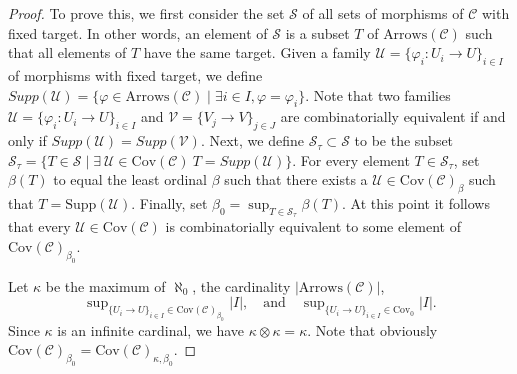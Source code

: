 \begin{proof}
To prove this, we first consider the set $\mathcal{S}$ of all
sets of morphisms of $\mathcal{C}$ with fixed target.
In other words, an element of $\mathcal{S}$ is a subset $T$
of $\text{Arrows}(\mathcal{C})$ such that all
elements of $T$ have the same target. Given a family
$\mathcal{U} = \{\varphi_i : U_i \to U\}_{i\in I}$ of morphisms with fixed
target, we define
$Supp(\mathcal{U}) = \{ \varphi \in \text{Arrows}(\mathcal{C})
\mid \exists i\in I, \varphi = \varphi_i\}$.
Note that two families $\mathcal{U} =  \{\varphi_i : U_i \to U\}_{i\in I}$
and $\mathcal{V} = \{V_j \to V\}_{j \in J}$ are combinatorially
equivalent if and only if $Supp(\mathcal{U}) = Supp(\mathcal{V})$.
Next, we define
$\mathcal{S}_\tau \subset \mathcal{S}$ to be the subset
$\mathcal{S}_\tau = \{ T \in \mathcal{S} \mid
\exists\ \mathcal{U} \in \text{Cov}(\mathcal{C}) \ T = Supp(\mathcal{U})\}$.
For every element $T \in \mathcal{S}_\tau$, set
$\beta(T)$ to equal the least ordinal $\beta$ such that
there exists a $\mathcal{U} \in \text{Cov}(\mathcal{C})_\beta$
such that $T = \text{Supp}(\mathcal{U})$. Finally, set
$\beta_0 = \sup_{T \in \mathcal{S}_\tau} \beta(T)$.
At this point it follows that every $\mathcal{U} \in \text{Cov}(\mathcal{C})$
is combinatorially equivalent to some element
of $\text{Cov}(\mathcal{C})_{\beta_0}$.

\medskip\noindent
Let $\kappa$ be the maximum of $\aleph_0$,
the cardinality $|\text{Arrows}(\mathcal{C})|$,
$$
\sup\nolimits_{\{U_i \to U\}_{i\in I} \in \text{Cov}(\mathcal{C})_{\beta_0}}
|I|,
\quad\text{and}\quad
\sup\nolimits_{\{U_i \to U\}_{i\in I} \in \text{Cov}_0} |I|.
$$
Since $\kappa$ is an infinite cardinal, we have
$\kappa \otimes \kappa = \kappa$. Note that obviously
$\text{Cov}(\mathcal{C})_{\beta_0} =
\text{Cov}(\mathcal{C})_{\kappa, \beta_0}$.


\end{proof}
